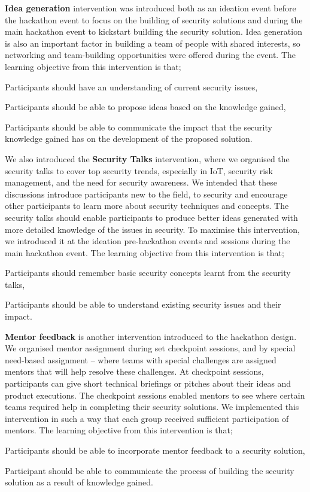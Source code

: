 \documentclass[runningheads]{llncs}
\begin{document}
\textbf{Idea generation} intervention was introduced both as an ideation event before the hackathon event to focus on the building of security solutions and during the main hackathon event to kickstart building the security solution. Idea generation is also an important factor in building a team of people with shared interests, so networking and team-building opportunities were offered during the event. The learning objective from this intervention is that; \begin{enumerate*}[label=(\arabic*)]
  \item Participants should have an understanding of current security issues,
  \item Participants should be able to propose ideas based on the knowledge gained,
  \item Participants should be able to communicate the impact that the security knowledge gained has on the development of the proposed solution.
\end{enumerate*}

We also introduced the \textbf{Security Talks} intervention, where we organised the security talks to cover top security trends, especially in IoT, security risk management, and the need for security awareness. We intended that these discussions introduce participants new to the field, to security and encourage other participants to learn more about security techniques and concepts. The security talks should enable participants to produce better ideas generated with more detailed knowledge of the issues in security. To maximise this intervention, we introduced it at the ideation pre-hackathon events and sessions during the main hackathon event. The learning objective from this intervention is that;
\begin{enumerate*}[label=(\arabic*)]
  \item Participants should remember basic security concepts learnt from the security talks,
  \item Participants should be able to understand existing security issues and their impact.
\end{enumerate*}

\textbf{Mentor feedback} is another intervention introduced to the hackathon design. We organised mentor assignment during set checkpoint sessions, and by special need-based assignment -- where teams with special challenges are assigned mentors that will help resolve these challenges. At checkpoint sessions, participants can give short technical briefings or pitches about their ideas and product executions. The checkpoint sessions enabled mentors to see where certain teams required help in completing their security solutions. 
We implemented this intervention in such a way that each group received sufficient participation of mentors. The learning objective from this intervention is that;
\begin{enumerate*}[label=(\arabic*)]
  \item Participants should be able to incorporate mentor feedback to a security solution,
  \item Participant should be able to communicate the process of building the security solution as a result of knowledge gained.
\end{enumerate*}
 
\end{document}
